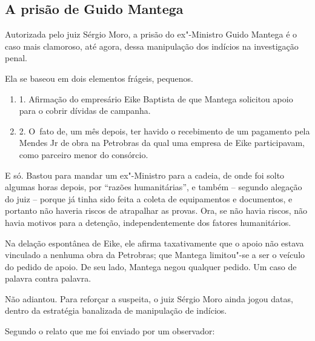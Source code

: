 \subsection{A prisão de Guido Mantega}

Autorizada pelo juiz Sérgio Moro, a prisão do ex"-Ministro Guido Mantega
é o caso mais clamoroso, até agora, dessa manipulação dos indícios na
investigação penal.

Ela se baseou em dois elementos frágeis, pequenos.

\begin{enumerate}
\itemsep1pt\parskip0pt
\item
  1. Afirmação do empresário Eike Baptista de que Mantega solicitou
  apoio para o  cobrir dívidas de campanha.
\item
  2. O~fato de, um mês depois, ter havido o recebimento de um pagamento
  pela Mendes Jr de obra na Petrobras da qual uma empresa de Eike
  participavam, como parceiro menor do consórcio.
\end{enumerate}

E só. Bastou para mandar um ex"-Ministro para a cadeia, de onde foi solto
algumas horas depois, por ``razões humanitárias'', e também -- segundo
alegação do juiz -- porque já tinha sido feita a coleta de equipamentos
e documentos, e portanto não haveria riscos de atrapalhar as provas.
Ora, se não havia riscos, não havia motivos para a detenção,
independentemente dos fatores humanitários.

Na delação espontânea de Eike, ele afirma taxativamente que o apoio não
estava vinculado a nenhuma obra da Petrobras; que Mantega limitou"-se a
ser o veículo do pedido de apoio. De seu lado, Mantega negou qualquer
pedido. Um caso de palavra contra palavra.

Não adiantou. Para reforçar a suspeita, o juiz Sérgio Moro ainda jogou
datas, dentro da estratégia banalizada de manipulação de indícios.

Segundo o relato que me foi enviado por um observador:

